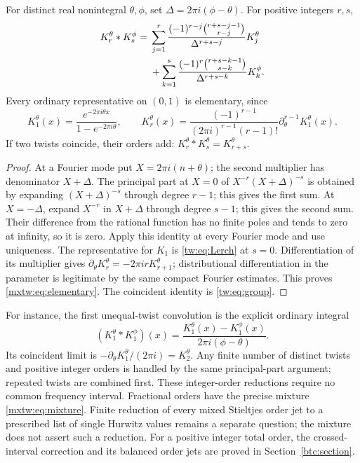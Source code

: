 \begin{theorem}
\label{mxtw:thm:integer}
For distinct real nonintegral $\theta,\phi$, set
$\Delta=2\pi i(\phi-\theta)$. For positive integers $r,s$,
\begin{align}\label{mxtw:eq:partial-fractions}
 K_r^\theta*K_s^\phi
 ={}&\sum_{j=1}^r
   \frac{(-1)^{r-j}\binom{r+s-j-1}{r-j}}
        {\Delta^{r+s-j}}K_j^\theta\notag\\
 &+\sum_{k=1}^s
   \frac{(-1)^r\binom{r+s-k-1}{s-k}}
        {\Delta^{r+s-k}}K_k^\phi.
\end{align}
Every ordinary representative on $(0,1)$ is elementary, since
\begin{equation}\label{mxtw:eq:elementary}
 K_1^\theta(x)=\frac{e^{-2\pi i\theta x}}{1-e^{-2\pi i\theta}},
 \qquad
 K_r^\theta(x)=
 \frac{(-1)^{r-1}}{(2\pi i)^{r-1}(r-1)!}
           \partial_\theta^{r-1}K_1^\theta(x).
\end{equation}
If two twists coincide, their orders add:
$K_r^\theta*K_s^\theta=K_{r+s}^\theta$.
\end{theorem}
\begin{proof}
At a Fourier mode put $X=2\pi i(n+\theta)$; the second multiplier
has denominator $X+\Delta$. The principal part at $X=0$ of
$X^{-r}(X+\Delta)^{-s}$ is obtained by expanding
$(X+\Delta)^{-s}$ through degree $r-1$; this gives the first sum.
At $X=-\Delta$, expand $X^{-r}$ in $X+\Delta$ through degree
$s-1$; this gives the second sum. Their difference from the rational
function has no finite poles and tends to zero at infinity, so it is
zero. Apply this identity at every Fourier mode and use uniqueness.
The representative for $K_1$ is \eqref{tw:eq:Lerch} at $s=0$.
Differentiation of its multiplier gives
$\partial_\theta K_r^\theta=-2\pi i rK_{r+1}^\theta$;
distributional differentiation in the parameter is legitimate by the
same compact Fourier estimates. This proves
\eqref{mxtw:eq:elementary}. The coincident identity is
\eqref{tw:eq:group}.
\end{proof}

For instance, the first unequal-twist convolution is the explicit
ordinary integral
\[
 (K_1^\theta*K_1^\phi)(x)
   =\frac{K_1^\theta(x)-K_1^\phi(x)}{2\pi i(\phi-\theta)}.
\]
Its coincident limit is
$-\partial_\theta K_1^\theta/(2\pi i)=K_2^\theta$.
Any finite number of distinct twists and positive integer orders is
handled by the same principal-part argument; repeated twists are
combined first. These integer-order reductions require no common
frequency interval. Fractional orders have the precise mixture
\eqref{mxtw:eq:mixture}. Finite reduction of every mixed Stieltjes
order jet to a prescribed list of single Hurwitz values remains a
separate question; the mixture does not assert such a reduction.
For a positive integer total order, the crossed-interval correction and
its balanced order jets are proved in Section~\ref{btc:section}.
